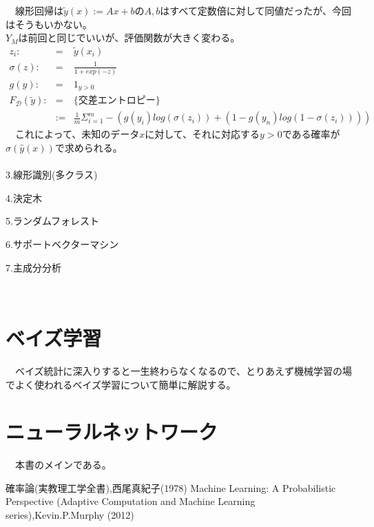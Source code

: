 \documentclass{jsarticle}
\begin{document}
 　線形回帰は$\tilde{y}(x):=Ax+b$の$A,b$はすべて定数倍に対して同値だったが、今回はそうもいかない。\\
  $Y_M$は前回と同じでいいが、評価関数が大きく変わる。
\begin{eqnarray}
z_i:&=&\tilde{y}(x_i)\nonumber\\
\sigma(z):&=&\frac{1}{1+exp(-z)}\nonumber\\
g(y):&=&1_{y>0}\nonumber\\
F_\mathcal{D}(\tilde{y}):&=&\{交差エントロピー\}\nonumber\\
&:=&\frac{1}{m}\Sigma_{i=1}^m -(g(y_i)log(\sigma(z_i))+(1-g(y_n)log(1-\sigma(z_i))))
\end{eqnarray}
　これによって、未知のデータ$x$に対して、それに対応する$y>0$である確率が$\sigma(\hat{y}(x))$で求められる。\\
　\\
3.線形識別(多クラス)

4.決定木

5.ランダムフォレスト

6.サポートベクターマシン

7.主成分分析


\newpage
\scalebox{1.1}{3.実装について}\\
\newpage
\section{ベイズ学習}
　ベイズ統計に深入りすると一生終わらなくなるので、とりあえず機械学習の場でよく使われるベイズ学習について簡単に解説する。\\

\newpage
\section{ニューラルネットワーク}
　本書のメインである。


\newpage
\begin{thebibliography}{99}
   確率論(実教理工学全書),西尾真紀子(1978)
   Machine Learning: A Probabilistic Perspective (Adaptive Computation and Machine Learning series),Kevin.P.Murphy (2012)

\end{thebibliography}



\newpage

　\\

　\\
\end{document}
